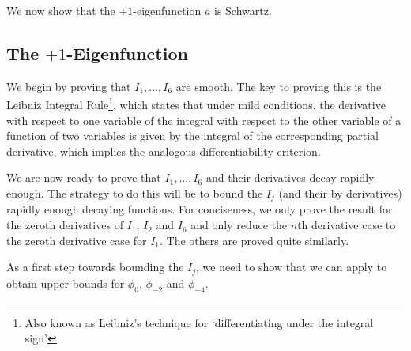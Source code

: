 We now show that the $+1$-eigenfunction $a$ is Schwartz.

\subsection{The $+1$-Eigenfunction}

We begin by proving that $I_1, \ldots, I_6$ are smooth. The key to proving this is the Leibniz Integral Rule\footnote{Also known as Leibniz's technique for `differentiating under the integral sign'}, which states that under mild conditions, the derivative with respect to one variable of the integral with respect to the other variable of a function of two variables is given by the integral of the corresponding partial derivative, which implies the analogous differentiability criterion.


We are now ready to prove that $I_1, \ldots, I_6$ and their derivatives decay rapidly enough. The strategy to do this will be to bound the $I_j$ (and their by derivatives) rapidly enough decaying functions. For conciseness, we only prove the result for the zeroth derivatives of $I_1$, $I_2$ and $I_6$ and only reduce the $n$th derivative case to the zeroth derivative case for $I_1$. The others are proved quite similarly.

As a first step towards bounding the $I_j$, we need to show that we can apply  to obtain upper-bounds for $\phi_0$, $\phi_{-2}$ and $\phi_{-4}$.

